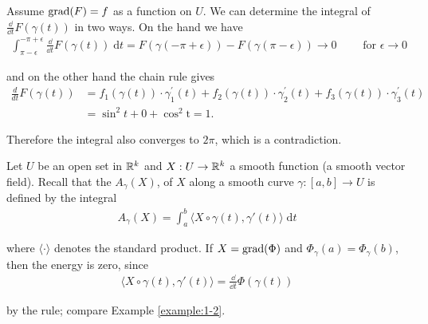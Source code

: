Assume $\operatorname{grad}(F) = f$ as a function on $U$. We can determine the integral of 
$\frac{\dd }{\dd t}F(\gamma(t))$ in two ways. On the hand we have
\begin{align*}
  \int_{\pi-\epsilon}^{-\pi+\epsilon}{\frac{\dd }{\dd t}F(\gamma(t)) \;\mathrm{d}t}
  = F(\gamma(-\pi+\epsilon)) - F(\gamma(\pi-\epsilon))
  \to 0\qquad \text{ for } \epsilon\to 0
\end{align*}

and on the other hand the chain rule gives
\begin{align*}
  \frac{d}{dt}F(\gamma(t))
  & = f_{1}(\gamma(t)) \cdot\gamma_{1}^{\prime}(t)+f_{2}(\gamma(t))\cdot\gamma_{2}^{\prime}(t)+f_{3}(\gamma(t))\cdot \gamma_{3}^{\prime}(t) \\
  & = \sin^{2}t+0+\cos^{2}\mathrm{t}=1.
\end{align*}

Therefore the integral also converges to $2\pi$, which is a contradiction.

\begin{example}
  Let $U$ be an open set in $\mathbb{R}^k$ and $X: U\to \mathbb{R}^k$ a smooth function (a smooth vector field). 
Recall that the  $A_\gamma(X)$, of $X$ along a smooth curve $\gamma: [a, b]\to U$ is 
defined by the integral
\begin{align*}
  A_\gamma(X) = \int_{a}^{b}{\langle X\circ \gamma(t), \gamma'(t)\rangle\;\mathrm{d}t}
\end{align*}

where $\langle\cdot\rangle$ denotes the standard product. If $X = \operatorname{grad}(\Phi)$ and $\Phi_\gamma(a) = \Phi_\gamma(b)$,
then the energy is zero, since 
\begin{align*}
  \langle X\circ \gamma(t), \gamma'(t)\rangle = \frac{\dd }{\dd t}\Phi(\gamma(t))
\end{align*}

by the rule; compare Example \ref{example:1-2}.
\end{example}